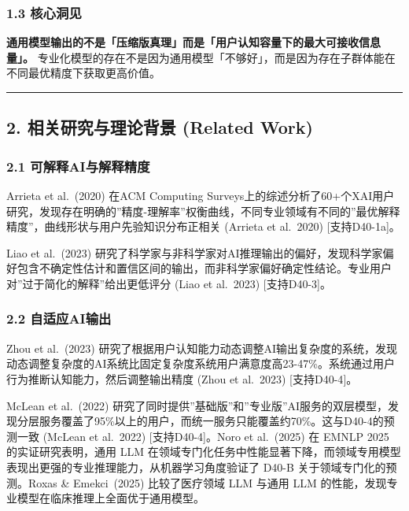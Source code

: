 \documentclass[UTF8, fontset=fandol]{ctexart}
\begin{document}
\subsubsection{1.3 核心洞见}\label{ux6838ux5fc3ux6d1eux89c1}

\textbf{通用模型输出的不是「压缩版真理」而是「用户认知容量下的最大可接收信息量」。}
专业化模型的存在不是因为通用模型「不够好」，而是因为存在子群体能在不同最优精度下获取更高价值。

\begin{center}\rule{0.5\linewidth}{0.5pt}\end{center}

\subsection{2. 相关研究与理论背景 (Related
Work)}\label{ux76f8ux5173ux7814ux7a76ux4e0eux7406ux8bbaux80ccux666f-related-work}

\subsubsection{2.1
可解释AI与解释精度}\label{ux53efux89e3ux91caaiux4e0eux89e3ux91caux7cbeux5ea6}

Arrieta et al.~(2020) 在ACM Computing
Surveys上的综述分析了60+个XAI用户研究，发现存在明确的''精度-理解率''权衡曲线，不同专业领域有不同的''最优解释精度''，曲线形状与用户先验知识分布正相关
(Arrieta et al.~2020) {[}支持D40-1a{]}。

Liao et al.~(2023)
研究了科学家与非科学家对AI推理输出的偏好，发现科学家偏好包含不确定性估计和置信区间的输出，而非科学家偏好确定性结论。专业用户对''过于简化的解释''给出更低评分
(Liao et al.~2023) {[}支持D40-3{]}。

\subsubsection{2.2 自适应AI输出}\label{ux81eaux9002ux5e94aiux8f93ux51fa}

Zhou et al.~(2023)
研究了根据用户认知能力动态调整AI输出复杂度的系统，发现动态调整复杂度的AI系统比固定复杂度系统用户满意度高23-47\%。系统通过用户行为推断认知能力，然后调整输出精度
(Zhou et al.~2023) {[}支持D40-4{]}。

McLean et al.~(2022)
研究了同时提供''基础版''和''专业版''AI服务的双层模型，发现分层服务覆盖了95\%以上的用户，而统一服务只能覆盖约70\%。这与D40-4的预测一致
(McLean et al.~2022) {[}支持D40-4{]}。Noro et al.~(2025) 在 EMNLP 2025 的实证研究表明，通用 LLM 在领域专门化任务中性能显著下降，而领域专用模型表现出更强的专业推理能力，从机器学习角度验证了 D40-B 关于领域专门化的预测。Roxas \& Emekci~(2025) 比较了医疗领域 LLM 与通用 LLM 的性能，发现专业模型在临床推理上全面优于通用模型。
\end{document}
